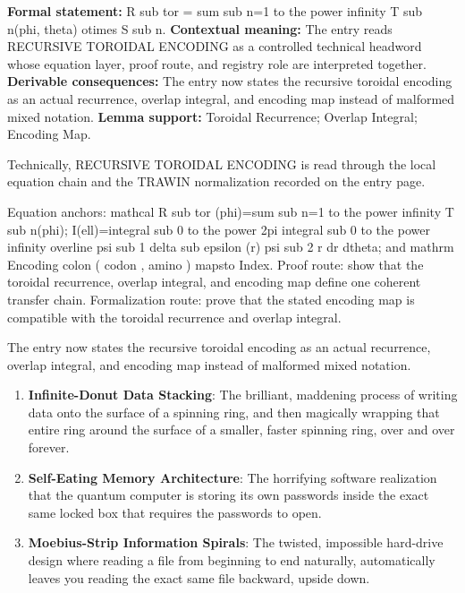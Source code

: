\begingroup\footnotesize\setlength{\emergencystretch}{3em}\sloppy
\textbf{Formal statement:} R sub tor = sum sub n=1 to the power infinity T sub n(phi, theta) otimes S sub n. \textbf{Contextual meaning:} The entry reads RECURSIVE TOROIDAL ENCODING as a controlled technical headword whose equation layer, proof route, and registry role are interpreted together. \textbf{Derivable consequences:} The entry now states the recursive toroidal encoding as an actual recurrence, overlap integral, and encoding map instead of malformed mixed notation. \textbf{Lemma support:} Toroidal Recurrence; Overlap Integral; Encoding Map.\par
\endgroup

Technically, RECURSIVE TOROIDAL ENCODING is read through the local equation chain and the TRAWIN normalization recorded on the entry page.

Equation anchors: mathcal R sub tor (phi)=sum sub n=1 to the power infinity T sub n(phi); I(ell)=integral sub 0 to the power 2pi integral sub 0 to the power infinity overline psi sub 1 delta sub epsilon (r) psi sub 2 r dr dtheta; and mathrm Encoding colon ( codon , amino ) mapsto Index. Proof route: show that the toroidal recurrence, overlap integral, and encoding map define one coherent transfer chain. Formalization route: prove that the stated encoding map is compatible with the toroidal recurrence and overlap integral.

The entry now states the recursive toroidal encoding as an actual recurrence, overlap integral, and encoding map instead of malformed mixed notation.
\endgroup

\begin{enumerate}[leftmargin=1.6em,itemsep=6pt,topsep=4pt]
\item \textbf{Infinite-Donut Data Stacking}: The brilliant, maddening process of writing data onto the surface of a spinning ring, and then magically wrapping that entire ring around the surface of a smaller, faster spinning ring, over and over forever.
\item \textbf{Self-Eating Memory Architecture}: The horrifying software realization that the quantum computer is storing its own passwords inside the exact same locked box that requires the passwords to open.
\item \textbf{Moebius-Strip Information Spirals}: The twisted, impossible hard-drive design where reading a file from beginning to end naturally, automatically leaves you reading the exact same file backward, upside down.
\end{enumerate}

